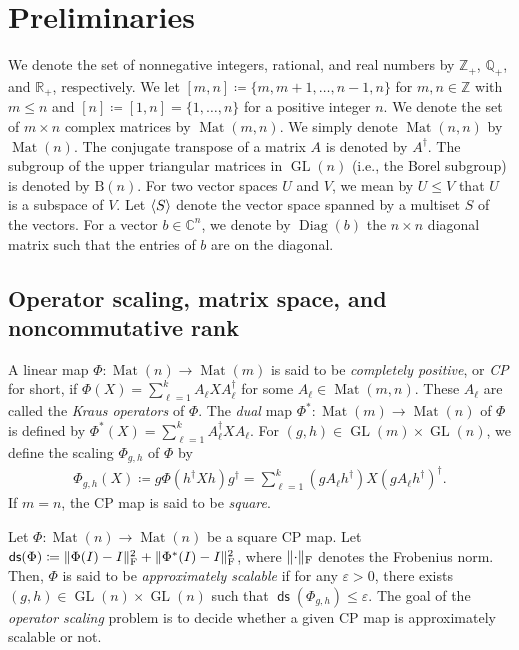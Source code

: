 \documentclass[a4paper,11pt]{article}
\numberwithin{equation}{section}
\newcommand{\C}{\mathbb{C}}
\newcommand{\R}{\mathbb{R}}
\newcommand{\Q}{\mathbb{Q}}
\newcommand{\Z}{\mathbb{Z}}
\newcommand{\eps}{\varepsilon}
\newcommand{\B}{\mathrm{B}}
\DeclareMathOperator{\ds}{\mathsf{ds}}
\DeclareMathOperator{\GL}{GL}
\DeclareMathOperator{\Mat}{Mat}
\DeclareMathOperator{\Diag}{Diag}
\DeclarePairedDelimiter{\norm}{\lVert}{\rVert}
\DeclarePairedDelimiter{\spnn}{\langle}{\rangle}
\begin{document}
\section{Preliminaries}\label{sec:prelim}
We denote the set of nonnegative integers, rational, and real numbers by $\Z_+$, $\Q_+$, and $\R_+$, respectively.
We let $[m, n] \coloneqq \{m, m+1, \dots, n-1, n\}$ for $m,n \in \Z$ with $m \leq n$ and $[n] \coloneqq [1, n] = \{1, \dotsc, n\}$ for a positive integer $n$.
We denote the set of $m \times n$ complex matrices by $\Mat(m, n)$.
We simply denote $\Mat(n, n)$ by $\Mat(n)$.
The conjugate transpose of a matrix $A$ is denoted by $A^\dagger$.
The subgroup of the upper triangular matrices in $\GL(n)$ (i.e., the Borel subgroup) is denoted by $\B(n)$.
For two vector spaces $U$ and $V$, we mean by $U \le V$ that $U$ is a subspace of $V$.
Let $\spnn{S}$ denote the vector space spanned by a multiset $S$ of the vectors.
For a vector $b \in \C^n$, we denote by $\Diag(b)$ the $n \times n$ diagonal matrix such that the entries of $b$ are on the diagonal.


\subsection{Operator scaling, matrix space, and noncommutative rank}
A linear map $\Phi: \Mat(n) \to \Mat(m)$ is said to be \emph{completely positive}, or \emph{CP} for short, if $\Phi(X) = \sum_{\ell=1}^k A_\ell X A_\ell^\dagger$ for some $A_\ell \in \Mat(m, n)$.
These $A_\ell$ are called the \emph{Kraus operators} of $\Phi$.
The \emph{dual} map $\Phi^*: \Mat(m) \to \Mat(n)$ of $\Phi$ is defined by $\Phi^*(X) = \sum_{\ell=1}^k A_\ell^\dagger X A_\ell$.
For $(g, h) \in \GL(m) \times \GL(n)$, we define the scaling $\Phi_{g,h}$ of $\Phi$ by 
\begin{align}
    \Phi_{g,h}(X) \coloneqq g \Phi(h^\dagger X h) g^\dagger = \sum_{\ell=1}^k (g A_\ell h^\dagger) X (g A_\ell h^\dagger)^\dagger.
\end{align}
If $m = n$, the CP map is said to be \emph{square}.

Let $\Phi: \Mat(n) \to \Mat(n)$ be a square CP map.
Let $\ds(\Phi) \coloneqq \norm{\Phi(I) - I}_{\mathrm F}^2 + \norm{\Phi^*(I) - I}_{\mathrm F}^2$, where $\norm{\cdot}_{\mathrm F}$ denotes the Frobenius norm.
Then, $\Phi$ is said to be \emph{approximately scalable} if for any $\eps > 0$, there exists $(g, h) \in \GL(n) \times \GL(n)$ such that $\ds(\Phi_{g,h}) \leq \eps$.
The goal of the \emph{operator scaling} problem is to decide whether a given CP map is approximately scalable or not.
\end{document}
